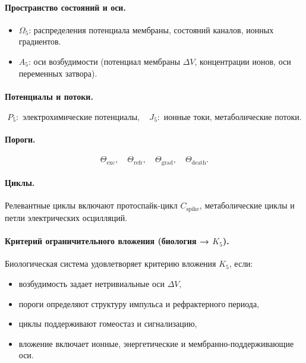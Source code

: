 \paragraph{Пространство состояний и оси.}
\begin{itemize}
  \item \(\Omega_5\): распределения потенциала мембраны, состояний каналов,
        ионных градиентов.
  \item \(A_5\): оси возбудимости (потенциал мембраны \(\Delta V\),
        концентрации ионов, оси переменных затвора).
\end{itemize}

\paragraph{Потенциалы и потоки.}
\[
  P_5:\text{ электрохимические потенциалы},\quad
  J_5:\text{ ионные токи, метаболические потоки}.
\]

\paragraph{Пороги.}
\[
  \Theta_{\mathrm{exc}},\quad
  \Theta_{\mathrm{refr}},\quad
  \Theta_{\mathrm{grad}},\quad
  \Theta_{\mathrm{death}}.
\]

\paragraph{Циклы.}
Релевантные циклы включают протоспайк-цикл \(C_{\mathrm{spike}}\),
метаболические циклы и петли электрических осцилляций.

\paragraph{Критерий ограничительного вложения (биология → \texorpdfstring{$K_5$}{K5}).}
Биологическая система удовлетворяет критерию вложения \(K_5\), если:
\begin{itemize}
  \item возбудимость задает нетривиальные оси \(\Delta V\),
  \item пороги определяют структуру импульса и рефрактерного периода,
  \item циклы поддерживают гомеостаз и сигнализацию,
  \item вложение включает ионные, энергетические и мембранно-поддерживающие
        оси.
\end{itemize}

